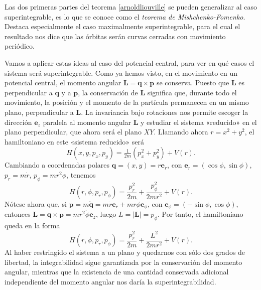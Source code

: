 \documentclass[12pt,a4paper,twocolumn,reqno]{amsart}
\theoremstyle{definition} \newtheorem{defn}[thm]{Definición}
\theoremstyle{definition} \newtheorem{ejemplo}[thm]{Ejemplo}
\theoremstyle{definition} \newtheorem{ejercicio}[thm]{Ejercicio}
\theoremstyle{remark} \newtheorem*{obs}{Observación}
\newcommand{\vect}[1]{\mathbf{#1}}
\begin{document}
  Las dos primeras partes del teorema \ref{arnoldliouville} se pueden generalizar al caso superintegrable, es lo que se conoce como el \emph{teorema de Mishchenko-Fomenko}. Destaca especialmente el caso maximalmente superintegrable, para el cual el resultado nos dice que las órbitas serán curvas cerradas con movimiento periódico.

  Vamos a aplicar estas ideas al caso del potencial central, para ver en qué casos el sistema será superintegrable. Como ya hemos visto, en el movimiento en un potencial central, el momento angular $\vect{L}=\vect{q}\times \vect{p}$ se conserva. Puesto que $\vect{L}$ es perpendicular a $\vect{q}$ y a $\vect{p}$, la conservación de $\vect{L}$ significa que, durante todo el movimiento, la posición y el momento de la partícula permanecen en un mismo plano, perpendicular a $\vect{L}$. La invariancia bajo rotaciones nos permite escoger la dirección $\vect{e}_z$ paralela al momento angular $\vect{L}$ y estudiar el sistema «reducido» en el plano perpendicular, que ahora será el plano $XY$. Llamando ahora $r=x^2+y^2$, el hamiltoniano en este «sistema reducido» será
  \begin{equation}
    H(x,y,p_x,p_y)= \tfrac{1}{2m}(p_x^2+p_y^2)+V(r).
  \end{equation}
  Cambiando a coordenadas polares $\vect{q}=(x,y)=r\vect{e}_{r}$, con $\vect{e}_r=(\cos \phi, \sin \phi)$, $p_r=m\dot r$, $p_{\phi}=mr^2\dot \phi$, tenemos
  \begin{equation}
    H(r,\phi,p_r,p_{\phi})=\frac{p_r^2}{2m}+\frac{p_{\phi}^2}{2mr^2}+V(r). 
  \end{equation}
  Nótese ahora que, si $\vect{p}=m\dot{\vect{q}}=m\dot r \vect{e}_r + mr \dot \phi \vect{e}_{\phi}$, con $\vect{e}_{\phi}=(-\sin \phi,\cos \phi)$, entonces $\vect{L}=\vect{q}\times \vect{p}=mr^2\dot \phi \vect{e}_z$, luego $L=|\vect{L}|=p_{\phi}$. Por tanto, el hamiltoniano queda en la forma
  \begin{equation}
    H(r,\phi,p_r,p_{\phi})=\frac{p_r^2}{2m}+\frac{L^2}{2mr^2}+V(r). 
  \end{equation}
  Al haber restringido el sistema a un plano y quedarnos con sólo dos grados de libertad, la integrabilidad sigue garantizada por la conservación del momento angular, mientras que la existencia de una cantidad conservada adicional independiente del momento angular nos daría la superintegrabilidad.
\end{document}
